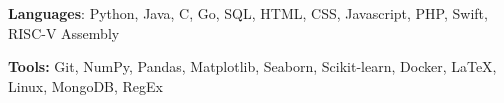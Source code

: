 \documentclass{article}
\begin{document}
    


    \begin{adjustwidth}{1em}{1em}
        
        \textbf{Languages}: Python, Java, C, Go, SQL, HTML, CSS, Javascript, PHP, Swift, RISC-V Assembly
    
        \vspace{1mm}

        \textbf{Tools:} Git, NumPy, Pandas, Matplotlib, Seaborn, Scikit-learn, Docker, \LaTeX, Linux, MongoDB, RegEx

    \end{adjustwidth}

    
\end{document}
